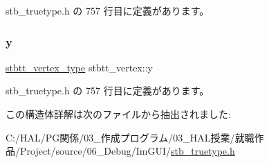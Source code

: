  stb\+\_\+truetype.\+h の 757 行目に定義があります。

\mbox{\label{structstbtt__vertex_a9052065ca544b63d537325b246928cfc}} 
\subsubsection{\texorpdfstring{y}{y}}
{\footnotesize\ttfamily \mbox{\hyperlink{stb__truetype_8h_ab8fd8e5e0b82b0f7da54532035e47b22}{stbtt\+\_\+vertex\+\_\+type}} stbtt\+\_\+vertex\+::y}



 stb\+\_\+truetype.\+h の 757 行目に定義があります。



この構造体詳解は次のファイルから抽出されました\+:\begin{DoxyCompactItemize}
\item 
C\+:/\+H\+A\+L/\+P\+G関係/03\+\_\+作成プログラム/03\+\_\+\+H\+A\+L授業/就職作品/\+Project/source/06\+\_\+\+Debug/\+Im\+G\+U\+I/\mbox{\hyperlink{stb__truetype_8h}{stb\+\_\+truetype.\+h}}\end{DoxyCompactItemize}
